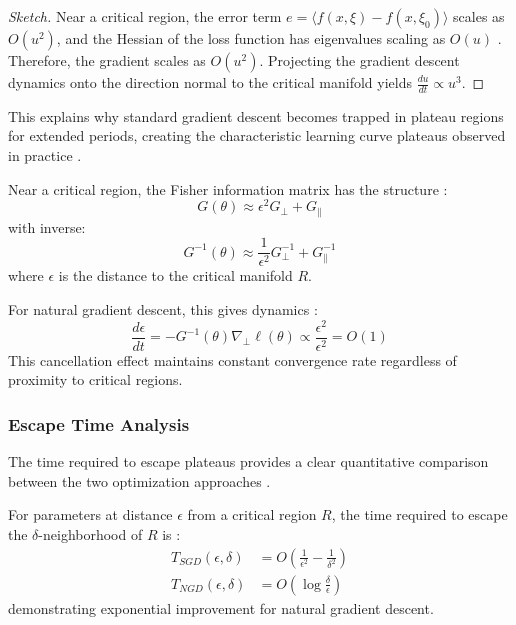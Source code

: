 \documentclass[a4paper]{article}
\begin{document}
\begin{proof}[Sketch]
Near a critical region, the error term $e = \langle f(x, \xi) - f(x, \xi_0) \rangle$ scales as $O(u^2)$, and the Hessian of the loss function has eigenvalues scaling as $O(u)$ \cite{wei2008dynamics}. Therefore, the gradient scales as $O(u^2)$. Projecting the gradient descent dynamics onto the direction normal to the critical manifold yields $\frac{du}{dt} \propto u^3$.
\end{proof}

This explains why standard gradient descent becomes trapped in plateau regions for extended periods, creating the characteristic learning curve plateaus observed in practice \cite{dauphin2014identifying, pascanu2014saddle}.

\begin{theorem}
Near a critical region, the Fisher information matrix has the structure \cite{amari1998natural, martens2015optimizing}:
\begin{equation}
G(\theta) \approx \epsilon^2 G_{\perp} + G_{\parallel}
\end{equation}
with inverse:
\begin{equation}
G^{-1}(\theta) \approx \frac{1}{\epsilon^2}G_{\perp}^{-1} + G_{\parallel}^{-1}
\end{equation}
where $\epsilon$ is the distance to the critical manifold $R$.

For natural gradient descent, this gives dynamics \cite{amari2016information}:
\begin{equation}
\frac{d\epsilon}{dt} = -G^{-1}(\theta)\nabla_{\perp} \ell(\theta) \propto \frac{\epsilon^2}{\epsilon^2} = O(1)
\end{equation}
This cancellation effect maintains constant convergence rate regardless of proximity to critical regions.
\end{theorem}

\subsubsection{Escape Time Analysis}

The time required to escape plateaus provides a clear quantitative comparison between the two optimization approaches \cite{dauphin2014identifying, martens2010deep}.

\begin{theorem}
For parameters at distance $\epsilon$ from a critical region $R$, the time required to escape the $\delta$-neighborhood of $R$ is \cite{amari2016information, wei2008dynamics}:
\begin{align}
T_{SGD}(\epsilon, \delta) &= O\left(\frac{1}{\epsilon^2} - \frac{1}{\delta^2}\right) \\
T_{NGD}(\epsilon, \delta) &= O\left(\log\frac{\delta}{\epsilon}\right)
\end{align}
demonstrating exponential improvement for natural gradient descent.
\end{theorem}
\end{document}

